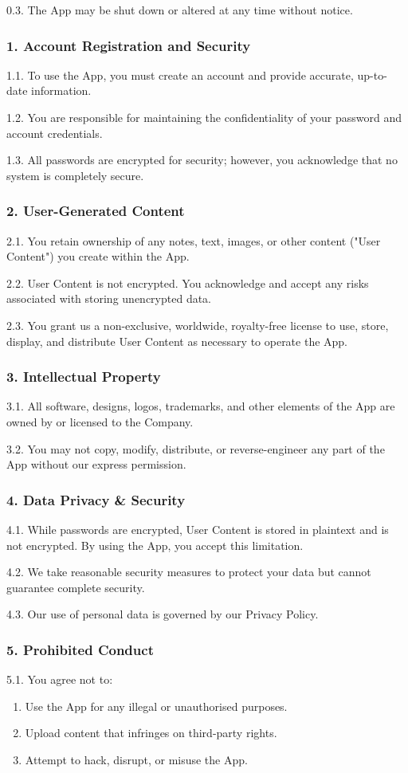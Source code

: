 0.3. The App may be shut down or altered at any time without notice.

\subsubsection*{1. Account Registration and Security}

1.1. To use the App, you must create an account and provide accurate, up-to-date information.

1.2. You are responsible for maintaining the confidentiality of your password and account credentials.

1.3. All passwords are encrypted for security; however, you acknowledge that no system is completely secure.

\subsubsection*{2. User-Generated Content}

2.1. You retain ownership of any notes, text, images, or other content ("User Content") you create within the App.

2.2. User Content is not encrypted. You acknowledge and accept any risks associated with storing unencrypted data.

2.3. You grant us a non-exclusive, worldwide, royalty-free license to use, store, display, and distribute User Content as necessary to operate the App.
\subsubsection*{3. Intellectual Property}
3.1. All software, designs, logos, trademarks, and other elements of the App are owned by or licensed to the Company.

3.2. You may not copy, modify, distribute, or reverse-engineer any part of the App without our express permission.
\subsubsection*{4. Data Privacy \& Security}
4.1. While passwords are encrypted, User Content is stored in plaintext and is not encrypted. By using the App, you accept this limitation.

4.2. We take reasonable security measures to protect your data but cannot guarantee complete security.

4.3. Our use of personal data is governed by our Privacy Policy.
\subsubsection*{5. Prohibited Conduct}
5.1. You agree not to:
\begin{enumerate}
	\item Use the App for any illegal or unauthorised purposes.
	\item Upload content that infringes on third-party rights.
	\item Attempt to hack, disrupt, or misuse the App.
\end{enumerate}
